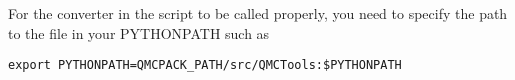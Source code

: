 For the converter in the script to be called properly, you need
to specify the path to the file in your PYTHONPATH such as


\begin{lstlisting}[style=SHELL]
export PYTHONPATH=QMCPACK_PATH/src/QMCTools:$PYTHONPATH
\end{lstlisting}






%
%











